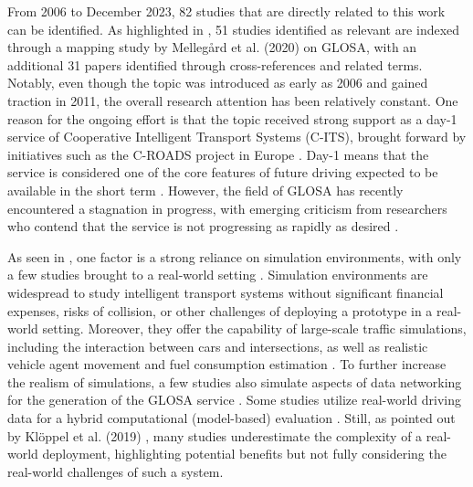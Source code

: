 From 2006 to December 2023, 82 studies that are directly related to this work can be identified. As highlighted in , 51 studies identified as relevant are indexed through a mapping study by Mellegård et al. (2020) \cite{mellegard_day_2020} on GLOSA, with an additional 31 papers identified through cross-references and related terms. Notably, even though the topic was introduced as early as 2006 and gained traction in 2011, the overall research attention has been relatively constant. One reason for the ongoing effort is that the topic received strong support as a day-1 service of Cooperative Intelligent Transport Systems (C-ITS), brought forward by initiatives such as the C-ROADS project in Europe \cite{sharara_impact_2019}. Day-1 means that the service is considered one of the core features of future driving expected to be available in the short term \cite{mellegard_day_2020}. However, the field of GLOSA has recently encountered a stagnation in progress, with emerging criticism from researchers who contend that the service is not progressing as rapidly as desired \cite{mellegard_day_2020, otto_framework_2023}.

As seen in , one factor is a strong reliance on simulation environments, with only a few studies brought to a real-world setting \cite{mellegard_day_2020}. Simulation environments are widespread to study intelligent transport systems without significant financial expenses, risks of collision, or other challenges of deploying a prototype in a real-world setting. Moreover, they offer the capability of large-scale traffic simulations, including the interaction between cars and intersections, as well as realistic vehicle agent movement and fuel consumption estimation \cite{kloeppel_performance_2019, pariota_green_2019}. To further increase the realism of simulations, a few studies also simulate aspects of data networking for the generation of the GLOSA service \cite{sharara_impact_2019}. Some studies utilize real-world driving data for a hybrid computational (model-based) evaluation \cite{raubitschek_predictive_2011, luo_green_2017, xie_dynamic_2021, bhattacharyya_assessing_2022}. Still, as pointed out by Klöppel et al. (2019) \cite{kloeppel_performance_2019}, many studies underestimate the complexity of a real-world deployment, highlighting potential benefits but not fully considering the real-world challenges of such a system.

